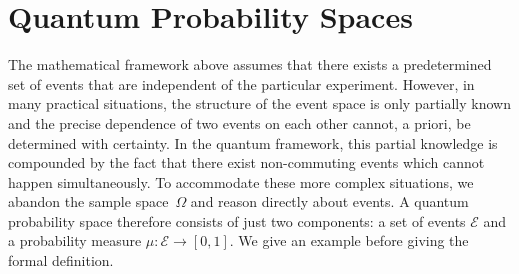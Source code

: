 \documentclass{article}
\theoremstyle{remark}
\newcommand{\qevents}{\ensuremath{\mathcal{E}}}
\newcommand{\imposs}{{\mbox{\wesa{impossible}}}}
\newcommand{\likely}{{\mbox{\wesa{likely}}}}
\newcommand{\unlikely}{{\mbox{\wesa{unlikely}}}}
\newcommand{\necess}{{\mbox{\wesa{certain}}}}
\begin{document}

\section{Quantum Probability Spaces}

The mathematical framework above assumes that there exists a
predetermined set of events that are independent of the particular
experiment. However, in many practical situations, the structure of
the event space is only partially known and the precise dependence of
two events on each other cannot, a priori, be determined with
certainty. In the quantum framework, this partial knowledge is
compounded by the fact that there exist non-commuting events which
cannot happen simultaneously. To accommodate these more complex
situations, we abandon the sample space~$\Omega$ and reason directly
about events. A quantum probability space therefore consists of just
two components: a set of events $\qevents$ and a probability measure
$\mu : \qevents \rightarrow [0,1]$. We give an example before giving
the formal definition.
\end{document}
